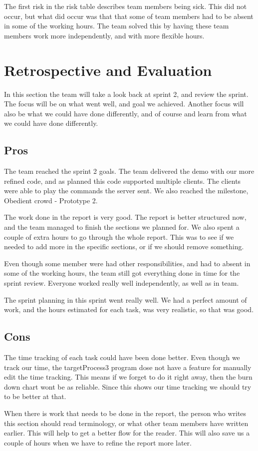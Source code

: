 The first risk in the risk table describes team members being sick. This did not occur, but what did occur was that that some of team members had to be absent in some of the working hours. 
The team solved this by having these team members work more independently, and with more flexible hours.  

\section{Retrospective and Evaluation}
In this section the team will take a look back at sprint 2, and review the sprint. The focus will be on what went well, and goal we achieved. Another focus will also be what we could have done differently, and of course and learn from what we could have done differently.

\subsection{Pros}
The team reached the sprint 2 goals. The team delivered the demo with our more refined code, and as planned this code supported multiple clients. The clients were able to play the commands the server sent. We also reached the milestone, Obedient crowd - Prototype 2.

The work done in the report is very good. The report is better structured now, and the team managed to finish the sections we planned for. We also spent a couple of extra hours to go through the whole report. This was to see if we needed to add more in the specific sections, or if we should remove something.  

Even though some member were had other responsibilities, and had to absent in some of the working hours, the team still got everything done in time for the sprint review. Everyone worked really well independently, as well as in team. 

The sprint planning in this sprint went really well. We had a perfect amount of work, and the hours estimated for each task, was very realistic, so that was good. 


\subsection{Cons}
The time tracking of each task could have been done better. 
Even though we track our time, the targetProcess3 program dose not have a feature for manually edit the time tracking. 
This means if we forget to do it right away, then the burn down chart wont be as reliable. Since this shows our time tracking we should try to be better at that.

When there is work that needs to be done in the report, the person who writes this section should read terminology, or what other team members have written earlier. This will help to get a better flow for the reader.
This will also save us a couple of hours when we have to refine the report more later. 
